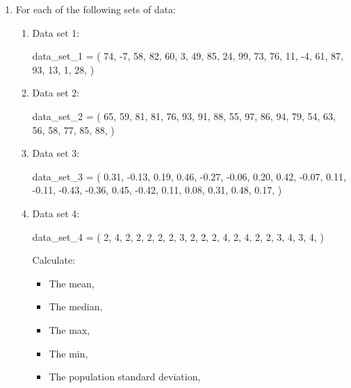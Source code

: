 \begin{enumerate}
\item 

For each of the following sets of data:
\begin{enumerate}

\item Data set 1:
\begin{pyin}
data_set_1 = (
    74,
    -7,
    58,
    82,
    60,
    3,
    49,
    85,
    24,
    99,
    73,
    76,
    11,
    -4,
    61,
    87,
    93,
    13,
    1,
    28,
)
\end{pyin}

\item Data set 2:
\begin{pyin}
data_set_2 = (
    65,
    59,
    81,
    81,
    76,
    93,
    91,
    88,
    55,
    97,
    86,
    94,
    79,
    54,
    63,
    56,
    58,
    77,
    85,
    88,
)
\end{pyin}

\item Data set 3:
\begin{pyin}
data_set_3 = (
    0.31,
    -0.13,
    0.19,
    0.46,
    -0.27,
    -0.06,
    0.20,
    0.42,
    -0.07,
    0.11,
    -0.11,
    -0.43,
    -0.36,
    0.45,
    -0.42,
    0.11,
    0.08,
    0.31,
    0.48,
    0.17,
)
\end{pyin}

\item Data set 4:
\begin{pyin}
data_set_4 = (
    2,
    4,
    2,
    2,
    2,
    2,
    2,
    3,
    2,
    2,
    2,
    4,
    2,
    4,
    2,
    2,
    3,
    4,
    3,
    4,
)
\end{pyin}


Calculate:
\begin{itemize}
\item 

The mean,

\item 

The median,

\item 

The max,

\item 

The min,

\item 

The population standard deviation,


\end{itemize}
\end{enumerate}
\end{enumerate}
